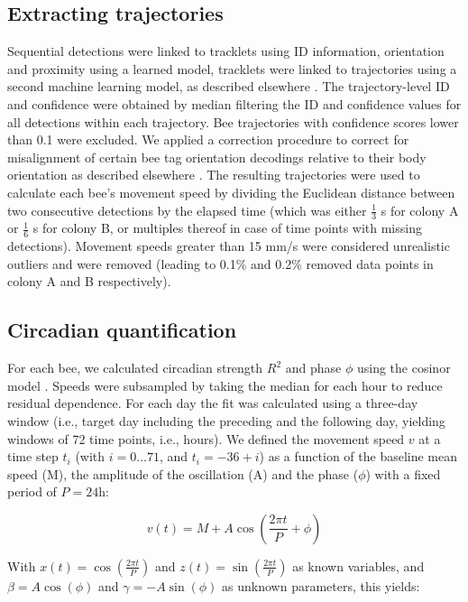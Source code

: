 \documentclass{article}
\begin{document}
\subsection*{Extracting trajectories}
Sequential detections were linked to tracklets using ID information, orientation and proximity using a learned model, tracklets were linked to trajectories using a second machine learning model, as described elsewhere \cite{boenisch_tracking_2018}. The trajectory-level ID and confidence were obtained by median filtering the ID and confidence values for all detections within each trajectory. Bee trajectories with confidence scores lower than 0.1 were excluded. We applied a correction procedure to correct for misalignment of certain bee tag orientation decodings relative to their body orientation as described elsewhere \cite{dormagen_machine_2023}. The resulting trajectories were used to calculate each bee’s movement speed by dividing the Euclidean distance between two consecutive detections by the elapsed time (which was either $\frac{1}{3}$ s for colony A or $\frac{1}{6}$ s for colony B, or multiples thereof in case of time points with missing detections). Movement speeds greater than 15 mm/s were considered unrealistic outliers and were removed (leading to 0.1\% and 0.2\% removed data points in colony A and B respectively).

\subsection*{Circadian quantification}
For each bee, we calculated circadian strength $R^2$ and phase $\phi$ using the cosinor model \cite{halberg_chronobiology_1969, nelson_methods_1979, bingham_inferential_1982}. Speeds were subsampled by taking the median for each hour to reduce residual dependence. For each day the fit was calculated using a three-day window (i.e., target day including the preceding and the following day, yielding windows of 72 time points, i.e., hours). We defined the movement speed $v$ at a time step $t_i$ (with $i = 0 \ldots 71$, and $t_i = -36 + i$) as a function of the baseline mean speed (M), the amplitude of the oscillation (A) and the phase ($\phi$) with a fixed period of $P = 24$h:

\begin{equation}
v(t) = M + A \cos\left(\frac{2 \pi t}{P} + \phi\right)
\end{equation}

With $x(t) = \cos\left(\frac{2\pi t}{P}\right)$ and $z(t) = \sin\left(\frac{2\pi t}{P}\right)$ as known variables, and $\beta = A \cos(\phi)$ and $\gamma = -A \sin(\phi)$ as unknown parameters, this yields:
\end{document}
